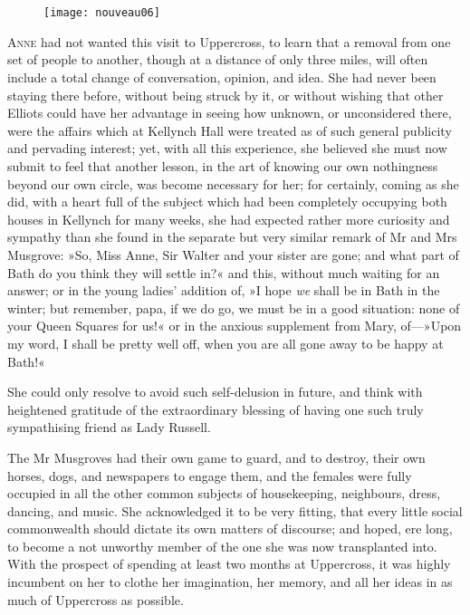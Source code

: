 \chapter[Chapter \thechapter]{}

\begin{figure}[t!]
\centering
\texttt{[image: nouveau06]}
\end{figure}

\lettrine[lines=4,lraise=0.3]{A}{nne} had not wanted this visit to Uppercross, to learn that a removal from one set of people to another, though at a distance of only three miles, will often include a total change of conversation, opinion, and idea. She had never been staying there before, without being struck by it, or without wishing that other Elliots could have her advantage in seeing how unknown, or unconsidered there, were the affairs which at Kellynch Hall were treated as of such general publicity and pervading interest; yet, with all this experience, she believed she must now submit to feel that another lesson, in the art of knowing our own nothingness beyond our own circle, was become necessary for her; for certainly, coming as she did, with a heart full of the subject which had been completely occupying both houses in Kellynch for many weeks, she had expected rather more curiosity and sympathy than she found in the separate but very similar remark of Mr and Mrs Musgrove: »So, Miss Anne, Sir Walter and your sister are gone; and what part of Bath do you think they will settle in?« and this, without much waiting for an answer; or in the young ladies' addition of, »I hope \textit{we} shall be in Bath in the winter; but remember, papa, if we do go, we must be in a good situation: none of your Queen Squares for us!« or in the anxious supplement from Mary, of—»Upon my word, I shall be pretty well off, when you are all gone away to be happy at Bath!«

She could only resolve to avoid such self-delusion in future, and think with heightened gratitude of the extraordinary blessing of having one such truly sympathising friend as Lady Russell.

The Mr Musgroves had their own game to guard, and to destroy, their own horses, dogs, and newspapers to engage them, and the females were fully occupied in all the other common subjects of housekeeping, neighbours, dress, dancing, and music. She acknowledged it to be very fitting, that every little social commonwealth should dictate its own matters of discourse; and hoped, ere long, to become a not unworthy member of the one she was now transplanted into. With the prospect of spending at least two months at Uppercross, it was highly incumbent on her to clothe her imagination, her memory, and all her ideas in as much of Uppercross as possible.

